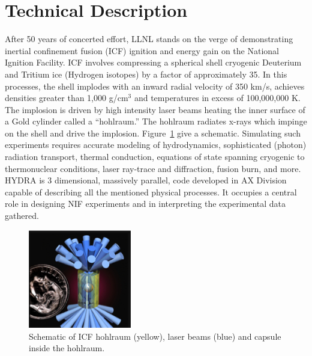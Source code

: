 \documentclass[letterpaper,11pt]{article}
\begin{document}

\section*{Technical Description}

After 50 years of concerted effort, LLNL stands on the verge of demonstrating inertial 
confinement fusion (ICF) ignition and energy gain on the National Ignition Facility\@.
ICF involves compressing a spherical shell cryogenic Deuterium and Tritium ice (Hydrogen isotopes) by a factor of approximately 35.  In this processes, the shell implodes with an inward radial
velocity of 350 km/s, achieves densities greater than
1,000 g/cm${}^3$ and temperatures in
excess of 100,000,000 K.  The implosion is driven by high intensity laser beams heating 
the inner surface of a Gold cylinder called a ``hohlraum.''  The hohlraum radiates x-rays 
which impinge on the shell and drive the implosion.  Figure~\ref{hohlraum} give a schematic.  Simulating such experiments requires accurate modeling of
hydrodynamics, sophisticated (photon) radiation transport, thermal conduction, equations 
of state spanning cryogenic to thermonuclear conditions, laser ray-trace and diffraction, fusion burn, and more.
HYDRA is 3 dimensional, massively parallel, code developed in AX Division capable of describing all the mentioned physical processes.
It occupies a central role in designing NIF experiments and in interpreting the experimental data gathered.  

\begin{figure}
	\vspace{-25pt}
	\begin{center}
		\includegraphics[width=0.40\textwidth]{hohlraum.jpg}
	\end{center}
	\caption{Schematic of ICF hohlraum (yellow), laser beams (blue) and capsule inside the hohlraum.}
	\label{hohlraum}
\end{figure}
\end{document}
